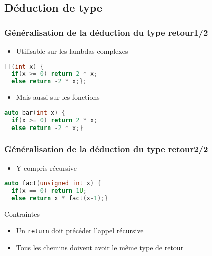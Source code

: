 \documentclass[C++.tex]{subfiles}
\begin{document}
\subsection*{Déduction de type}
\begin{frame}[fragile]
	\frametitle{Généralisation de la déduction du type retour\titlehfill{}1/2}
	\begin{itemize}
		\item Utilisable sur les lambdas complexes
	\end{itemize}

	\begin{lstlisting}[language=C++]
[](int x) { 
  if(x >= 0) return 2 * x; 
  else return -2 * x;};\end{lstlisting}

	\pause

	\begin{itemize}
		\item Mais aussi sur les fonctions
	\end{itemize}

	\begin{lstlisting}[language=C++]
auto bar(int x) {
  if(x >= 0) return 2 * x; 
  else return -2 * x;}\end{lstlisting}
\end{frame}

\begin{frame}[fragile]
	\frametitle{Généralisation de la déduction du type retour\titlehfill{}2/2}
	\begin{itemize}
		\item Y compris récursive
	\end{itemize}

	\begin{lstlisting}[language=C++]
auto fact(unsigned int x) {
  if(x == 0) return 1U;
  else return x * fact(x-1);}\end{lstlisting}

	\begin{alertblock}{Contraintes}
		\begin{itemize}
			\item Un \lstinline|return| doit précéder l'appel récursive
			\item Tous les chemins doivent avoir le même type de retour
		\end{itemize}
	\end{alertblock}
\end{frame}
\end{document}
